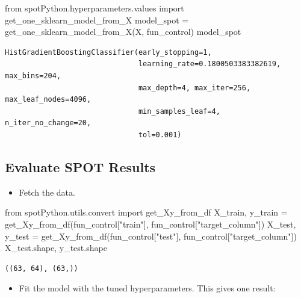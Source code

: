 \documentclass[
  letterpaper,
  DIV=11,
  numbers=noendperiod]{scrreprt}
\newenvironment{Shaded}{\begin{snugshade}}{\end{snugshade}}
\newcommand{\ImportTok}[1]{\textcolor[rgb]{0.00,0.46,0.62}{#1}}
\newcommand{\NormalTok}[1]{\textcolor[rgb]{0.00,0.23,0.31}{#1}}
\newcommand{\OperatorTok}[1]{\textcolor[rgb]{0.37,0.37,0.37}{#1}}
\newcommand{\StringTok}[1]{\textcolor[rgb]{0.13,0.47,0.30}{#1}}
\providecommand{\tightlist}{%
  \setlength{\itemsep}{0pt}\setlength{\parskip}{0pt}}\usepackage{longtable,booktabs,array}
\begin{document}
\begin{Shaded}
\begin{Highlighting}[]
\ImportTok{from}\NormalTok{ spotPython.hyperparameters.values }\ImportTok{import}\NormalTok{ get\_one\_sklearn\_model\_from\_X}
\NormalTok{model\_spot }\OperatorTok{=}\NormalTok{ get\_one\_sklearn\_model\_from\_X(X, fun\_control)}
\NormalTok{model\_spot}
\end{Highlighting}
\end{Shaded}

\begin{verbatim}
HistGradientBoostingClassifier(early_stopping=1,
                               learning_rate=0.1800503383382619, max_bins=204,
                               max_depth=4, max_iter=256, max_leaf_nodes=4096,
                               min_samples_leaf=4, n_iter_no_change=20,
                               tol=0.001)
\end{verbatim}

\hypertarget{evaluate-spot-results-1}{%
\subsection{Evaluate SPOT Results}\label{evaluate-spot-results-1}}

\begin{itemize}
\tightlist
\item
  Fetch the data.
\end{itemize}

\begin{Shaded}
\begin{Highlighting}[]
\ImportTok{from}\NormalTok{ spotPython.utils.convert }\ImportTok{import}\NormalTok{ get\_Xy\_from\_df}
\NormalTok{X\_train, y\_train }\OperatorTok{=}\NormalTok{ get\_Xy\_from\_df(fun\_control[}\StringTok{"train"}\NormalTok{], fun\_control[}\StringTok{"target\_column"}\NormalTok{])}
\NormalTok{X\_test, y\_test }\OperatorTok{=}\NormalTok{ get\_Xy\_from\_df(fun\_control[}\StringTok{"test"}\NormalTok{], fun\_control[}\StringTok{"target\_column"}\NormalTok{])}
\NormalTok{X\_test.shape, y\_test.shape}
\end{Highlighting}
\end{Shaded}

\begin{verbatim}
((63, 64), (63,))
\end{verbatim}

\begin{itemize}
\tightlist
\item
  Fit the model with the tuned hyperparameters. This gives one result:
\end{itemize}
\end{document}
